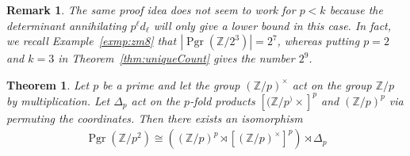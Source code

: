 \documentclass[oneside]{amsart}
\theoremstyle{nthm}
\newtheorem{thm2}[subsection]{Theorem}
\theoremstyle{ndef}
\theoremstyle{nrem}
\newtheorem{rem}[subsection]{Remark}
\newcommand{\Z}{\mathbb{Z}}
\DeclareMathOperator{\Pgr}{Pgr}
\begin{document}
\begin{rem}
    The same proof idea does not seem to work for $p < k$ because the determinant annihilating $p^\ell d_\ell$ will only give a lower bound in this case. In fact, we recall Example~\ref{exmp:zm8} that $|\Pgr(\Z/2^3)| = 2^7$, whereas putting $p=2$ and $k=3$ in Theorem~\ref{thm:uniqueCount} gives the number $2^9$. 
\end{rem}

\begin{thm2}
    Let $p$ be a prime and let the group $(\Z/p)^\times$ act on the group $\Z/p$ by multiplication. Let $\Delta_p$ act on the $p$-fold products $[(\Z/p^)\times]^p$ and $(\Z/p)^p$ via permuting the coordinates. Then there exists an isomorphism
    \begin{align*}
        \Pgr(\Z/p^2)\cong ( (\Z/p)^p\rtimes [(\Z/p)^\times]^p)\rtimes \Delta_p
    \end{align*}
\end{thm2}
\end{document}
